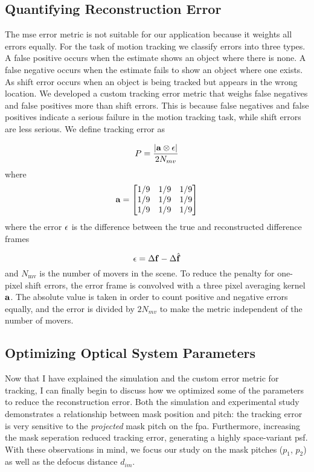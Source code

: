 \subsection{Quantifying Reconstruction Error}

The \gls{mse} error metric is not suitable for our application because it weights all errors equally. For the task of motion tracking we classify errors into three types. A false positive occurs when the estimate shows an object where there is none. A false negative occurs when the estimate fails to show an object where one exists. As shift error occurs when an object is being tracked but appears in the wrong location. We developed a custom tracking error metric that weighs false negatives and false positives more than shift errors. This is because false negatives and false positives indicate a serious failure in the motion tracking task, while shift errors are less serious. We define tracking error as

\begin{equation}
	P = \frac{ | \displaystyle \mathbf{a}   \otimes \displaystyle \mathbf{\epsilon} |}{2N_{mv}}
	\label{eq:scoutErrorMetric}
\end{equation}
%
where
%
\begin{equation}
	\displaystyle \mathbf{a} = 
	\begin{bmatrix}
	    1/9 & 1/9 & 1/9 \\
	    1/9 & 1/9 & 1/9 \\
	    1/9 & 1/9 & 1/9 
	\end{bmatrix}
\end{equation}
%
where the error $\displaystyle \mathbf{\epsilon}$ is the difference between the true and reconstructed difference frames
%

\begin{equation}
	\displaystyle \mathbf{\epsilon} = \Delta \displaystyle \mathbf{f} - \Delta \hat{ \displaystyle \mathbf{f} }
\end{equation}
%
and $N_{\text{mv}}$ is the number of movers in the scene. To reduce the penalty for one-pixel shift errors, the error frame is convolved with a three pixel averaging kernel $\displaystyle \mathbf{a}$. The absolute value is taken in order to count positive and negative errors equally, and the error is divided by $2N_{mv}$ to make the metric independent of the number of movers. 

\subsection{Optimizing Optical System Parameters}

Now that I have explained the simulation and the custom error metric for tracking, I can finally begin to discuss how we optimized some of the parameters to reduce the reconstruction error. Both the simulation and experimental study demonstrates a relationship between mask position and pitch: the tracking error is very sensitive to the \emph{projected} mask pitch on the \gls{fpa}. Furthermore, increasing the mask seperation reduced tracking error, generating a highly space-variant \gls{psf}. With these observations in mind, we focus our study on the mask pitches ($p_1$, $p_2$) as well as the defocus distance $d_{im}$. 

